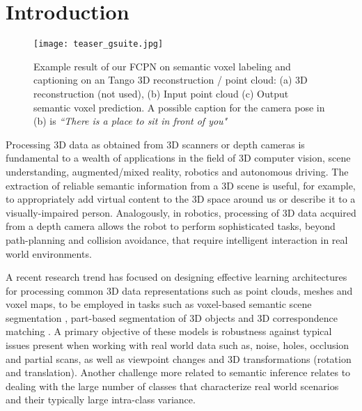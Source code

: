 \documentclass[runningheads]{llncs}
\begin{document}
\section{Introduction}

\begin{figure}[t]
    \centering
 \texttt{[image: teaser\_gsuite.jpg]} 
    \caption{Example result of our FCPN on semantic voxel labeling and captioning on an Tango 3D reconstruction / point cloud: (a) 3D reconstruction (not used), (b) Input point cloud (c) Output semantic voxel prediction. A possible caption for the camera pose in (b) is \textit{``There is a place to sit in front of you"}}
    \label{fig:teaser} 
\end{figure}

Processing 3D data as obtained from 3D scanners or depth cameras is fundamental to a wealth of applications in the field of 3D computer vision, scene understanding, augmented/mixed reality, robotics and autonomous driving. 
The extraction of reliable semantic information from a 3D scene is useful, for example, to appropriately add virtual content to the 3D space around us or describe it to a visually-impaired person. Analogously, in robotics, processing of 3D data acquired from a depth camera allows the robot to perform sophisticated tasks, beyond path-planning and collision avoidance, that require intelligent interaction in real world environments.


A recent research trend has focused on designing effective learning architectures for processing common 3D data representations such as point clouds, meshes and voxel maps, to be employed in tasks such as voxel-based semantic scene segmentation \cite{Dai2017}, part-based segmentation of 3D objects \cite{Qi2017} and 3D correspondence matching \cite{Zeng2016}. A primary objective of these models is robustness against typical issues present when working with real world data such as, noise, holes, occlusion and partial scans, as well as viewpoint changes and 3D transformations (rotation and translation). Another challenge more related to semantic inference relates to dealing with the large number of classes that characterize real world scenarios and their typically large intra-class variance. 
\end{document}
